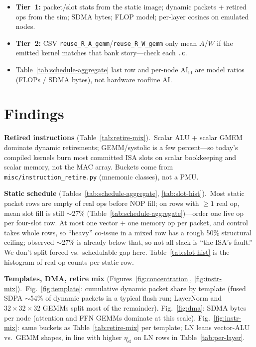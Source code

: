 \documentclass[10pt,letterpaper]{article}
\begin{document}
\begin{itemize}[nosep,leftmargin=1.2em]
  \item \textbf{Tier~1:} packet/slot stats from the static image; dynamic packets + retired ops from the sim; SDMA bytes; FLOP model; per-layer cosines on emulated nodes.
  \item \textbf{Tier~2:} CSV \texttt{reuse\_R\_A\_gemm}/\texttt{reuse\_R\_W\_gemm} only mean $A$/$W$ if the emitted kernel matches that bank story---check each \texttt{.c}.
  \item Table~\ref{tab:schedule-aggregate} last row and per-node $\mathrm{AI}_{\mathrm{ld}}$ are model ratios (FLOPs / SDMA bytes), not hardware roofline AI.
\end{itemize}

\section{Findings}

\medskip
\noindent\textbf{Retired instructions} (Table~\ref{tab:retire-mix}).\ 
Scalar ALU + scalar GMEM dominate dynamic retirements; GEMM/systolic is a few percent---so today’s compiled kernels burn most committed ISA slots on scalar bookkeeping and scalar memory, not the MAC array. Buckets come from \texttt{misc/instruction\_retire.py} (mnemonic classes), not a PMU.



\medskip
\noindent\textbf{Static schedule} (Tables~\ref{tab:schedule-aggregate}, \ref{tab:slot-hist}).\ 
Most static packet rows are empty of real ops before NOP fill; on rows with $\geq 1$ real op, mean slot fill is still $\sim$27\% (Table~\ref{tab:schedule-aggregate})---order one live op per four-slot row.
At most one vector + one memory op per packet, and control takes whole rows, so “heavy” co-issue in a mixed row has a rough 50\% structural ceiling; observed $\sim$27\% is already below that, so not all slack is “the ISA’s fault.” We don’t split forced vs.\ schedulable gap here.
Table~\ref{tab:slot-hist} is the histogram of real-op counts per static row.



\medskip
\noindent\textbf{Templates, DMA, retire mix} (Figures~\ref{fig:concentration}, \ref{fig:instr-mix}).\ 
Fig.~\ref{fig:template}: cumulative dynamic packet share by template (fused SDPA $\sim$54\% of dynamic packets in a typical flash run; LayerNorm and $32{\times}32{\times}32$ GEMMs split most of the remainder).
Fig.~\ref{fig:dma}: SDMA bytes per node (attention and FFN GEMMs dominate at this scale).
Fig.~\ref{fig:instr-mix}: same buckets as Table~\ref{tab:retire-mix} per template; LN leans vector-ALU vs.\ GEMM shapes, in line with higher $\eta_{\mathrm{st}}$ on LN rows in Table~\ref{tab:per-layer}.
\end{document}
